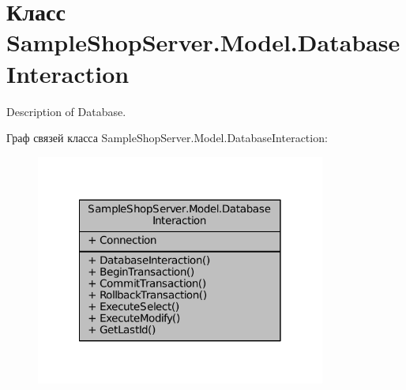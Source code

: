 \hypertarget{class_sample_shop_server_1_1_model_1_1_database_interaction}{}\section{Класс Sample\+Shop\+Server.\+Model.\+Database\+Interaction}
\label{class_sample_shop_server_1_1_model_1_1_database_interaction}


Description of Database.  




Граф связей класса Sample\+Shop\+Server.\+Model.\+Database\+Interaction\+:
\nopagebreak
\begin{figure}[H]
\begin{center}
\leavevmode
\includegraphics[width=270pt]{class_sample_shop_server_1_1_model_1_1_database_interaction__coll__graph}
\end{center}
\end{figure}
